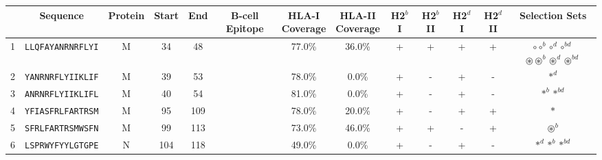 \begin{tabular}{rcccccccccccc}
\toprule
{} &                  Sequence & Protein &  Start &   End & B-cell Epitope & \Centerstack{HLA-I \\ Coverage} & \Centerstack{HLA-II \\ Coverage} & H2$^{b}$ I & H2$^{b}$ II & H2$^{d}$ I & H2$^{d}$ II &                                                                                                          Selection Sets \\
\midrule
1  &  \texttt{LLQFAYANRNRFLYI} &       M &     34 &    48 &                &                          77.0\% &                           36.0\% &          + &           + &          + &           + &  \Centerstack{  $\circ \circ^b \circ^d \circ^{bd}$ \\  $\circledast \circledast^b \circledast^d \circledast^{bd}$ \\  } \\
2  &  \texttt{YANRNRFLYIIKLIF} &       M &     39 &    53 &                &                          78.0\% &                            0.0\% &          + &           - &          + &           - &                                                                                                              $ \ast^d $ \\
3  &  \texttt{ANRNRFLYIIKLIFL} &       M &     40 &    54 &                &                          81.0\% &                            0.0\% &          + &           - &          + &           - &                                                                                                    $ \ast^b \ast^{bd} $ \\
4  &  \texttt{YFIASFRLFARTRSM} &       M &     95 &   109 &                &                          78.0\% &                           20.0\% &          + &           - &          + &           + &                                                                                                                $ \ast $ \\
5  &  \texttt{SFRLFARTRSMWSFN} &       M &     99 &   113 &                &                          73.0\% &                           46.0\% &          + &           + &          - &           + &                                                                                                       $ \circledast^b $ \\
6  &  \texttt{LSPRWYFYYLGTGPE} &       N &    104 &   118 &                &                          49.0\% &                            0.0\% &          + &           - &          + &           - &                                                                                             $ \ast^d \ast^b \ast^{bd} $ \\

\end{tabular}
